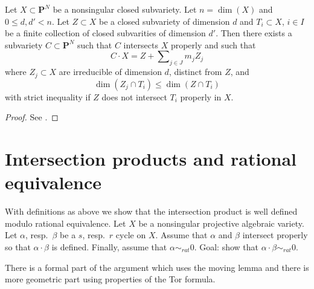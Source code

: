 \begin{lemma}
\label{lemma-moving}
Let $X \subset \mathbf{P}^N$ be a nonsingular closed subvariety.
Let $n = \dim(X)$ and $0 \leq d, d' < n$. Let $Z \subset X$ be a closed
subvariety of dimension $d$ and $T_i \subset X$, $i \in I$ be a finite
collection of closed subvarities of dimension $d'$. Then there exists
a subvariety $C \subset \mathbf{P}^N$ such that $C$ intersects $X$
properly and such that
$$
C \cdot X = Z + \sum\nolimits_{j \in J} m_j Z_j
$$
where $Z_j \subset X$ are irreducible of dimension $d$, distinct from $Z$, and
$$
\dim(Z_j \cap T_i) \leq \dim(Z \cap T_i)
$$
with strict inequality if $Z$ does not intersect $T_i$ properly in $X$.
\end{lemma}

\begin{proof}
See \cite{Roberts}.
\end{proof}



\section{Intersection products and rational equivalence}
\label{section-intersections-and-rational-equivalence}

\noindent
With definitions as above we show that
the intersection product is well defined modulo rational
equivalence. Let $X$ be a nonsingular projective algebraic
variety. Let $\alpha$, resp.\ $\beta$ be a $s$, resp.\ $r$
cycle on $X$. Assume that $\alpha$ and $\beta$ intersect
properly so that $\alpha \cdot \beta$ is defined. Finally,
assume that $\alpha \sim_{rat} 0$. Goal: show that
$\alpha \cdot \beta \sim_{rat} 0$.

\medskip\noindent
There is a formal part of the argument which uses the moving lemma
and there is more geometric part using properties of the Tor formula.


